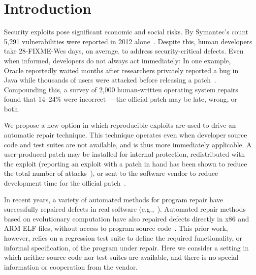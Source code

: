 \documentclass{sigcomm-alternate}
\begin{document}
\section{Introduction}
\label{sec-1}
Security exploits pose significant economic and social risks. By Symantec's
count 5,291 vulnerabilities were reported in 2012
alone~\cite{symantec2013threat}. Despite this, human developers take
28-FIXME-Wes
days, on average, to address security-critical defects. Even
when informed, developers do not always act immediately:  In one example,
Oracle reportedly waited months after researchers privately reported a bug
in Java while thousands of users were attacked before releasing a
patch~\cite{greenberg2012oracle}.  Compounding this, a survey of 2,000
human-written operating system repairs found that 14--24\% were
incorrect~\cite{fixes-become-bugs}---the official patch may be late, wrong,
or both.  

We propose a new option in which reproducible exploits are used to drive an
automatic repair technique. This technique operates even when developer
source code and test suites are not available, and is thus more immediately
applicable. A user-produced patch may be installed for internal protection,
redistributed with the exploit (reporting an exploit with a patch in hand
has been shown to reduce the total number of attacks~\cite{arora2006does}),
or sent to the software vendor to reduce development time for the official
patch~\cite{weimer06}.

In recent years, a variety of automated methods for program repair
have successfully repaired defects in real software
(e.g.,~\cite{clearview,genprog-tse-journal,par,nguyen2013semfix}).
Automated repair methods based on evolutionary computation have also
repaired defects directly in x86 and ARM ELF files, without access to
program source code~\cite{schulte2013embedded}.  This prior work,
however, relies on a regression test suite to define the required
functionality, or informal specification, of the program under repair.
Here we consider a setting in which neither source code nor test
suites are available, and there is no special information or
cooperation from the vendor.
\end{document}
